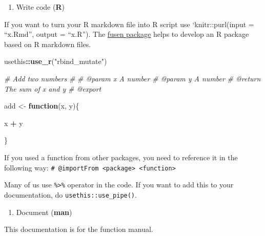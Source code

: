 \documentclass[
]{book}
\newenvironment{Shaded}{\begin{snugshade}}{\end{snugshade}}
\newcommand{\CommentTok}[1]{\textcolor[rgb]{0.56,0.35,0.01}{\textit{#1}}}
\newcommand{\ControlFlowTok}[1]{\textcolor[rgb]{0.13,0.29,0.53}{\textbf{#1}}}
\newcommand{\KeywordTok}[1]{\textcolor[rgb]{0.13,0.29,0.53}{\textbf{#1}}}
\newcommand{\NormalTok}[1]{#1}
\newcommand{\OperatorTok}[1]{\textcolor[rgb]{0.81,0.36,0.00}{\textbf{#1}}}
\newcommand{\StringTok}[1]{\textcolor[rgb]{0.31,0.60,0.02}{#1}}
\providecommand{\tightlist}{%
  \setlength{\itemsep}{0pt}\setlength{\parskip}{0pt}}
\begin{document}
\begin{enumerate}
\def\labelenumi{\arabic{enumi}.}
\setcounter{enumi}{1}
\tightlist
\item
  Write code (\textbf{R})
\end{enumerate}

If you want to turn your R markdown file into R script use `knitr::purl(input = ``x.Rmd'',
output = ``x.R''). The \href{https://thinkr-open.github.io/fusen/}{fusen package} helps to develop an R package based on R markdown files.

\begin{Shaded}
\begin{Highlighting}[]
\NormalTok{usethis}\OperatorTok{::}\KeywordTok{use\_r}\NormalTok{(}\StringTok{"rbind\_mutate"}\NormalTok{)}
\end{Highlighting}
\end{Shaded}

\begin{Shaded}
\begin{Highlighting}[]
\CommentTok{\#\textquotesingle{} Add two numbers}
\CommentTok{\#\textquotesingle{}}
\CommentTok{\#\textquotesingle{} @param x A number}
\CommentTok{\#\textquotesingle{} @param y A number}
\CommentTok{\#\textquotesingle{} @return The sum of x and y }
\CommentTok{\#\textquotesingle{} @export}

\NormalTok{add \textless{}{-}}\StringTok{ }\ControlFlowTok{function}\NormalTok{(x, y)\{}
  
\NormalTok{  x }\OperatorTok{+}\StringTok{ }\NormalTok{y}
  
\NormalTok{\}}
\end{Highlighting}
\end{Shaded}

If you used a function from other packages, you need to reference it in the following way: \texttt{\#\textquotesingle{}\ @importFrom\ \textless{}package\textgreater{}\ \textless{}function\textgreater{}}

Many of us use \texttt{\%\textgreater{}\%} operator in the code. If you want to add this to your documentation, do \texttt{usethis::use\_pipe()}.

\begin{enumerate}
\def\labelenumi{\arabic{enumi}.}
\setcounter{enumi}{2}
\tightlist
\item
  Document (\textbf{man})
\end{enumerate}

This documentation is for the function manual.
\end{document}
